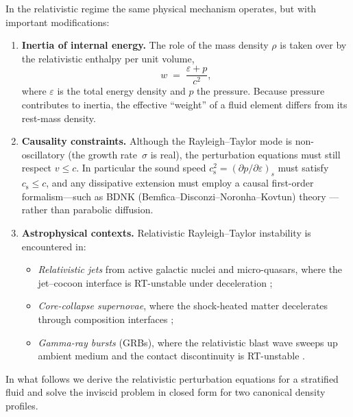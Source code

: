 In the relativistic regime the same physical mechanism operates, but with
important modifications:
\begin{enumerate}
\item \textbf{Inertia of internal energy.}  The role of the mass density
  $\rho$ is taken over by the relativistic enthalpy per unit volume,
  \begin{equation}
  \label{eq:rel-10-w-def}
  w \;=\; \frac{\varepsilon + p}{c^{2}},
  \end{equation}
  where $\varepsilon$ is the total energy density and $p$ the pressure.
  Because pressure contributes to inertia, the effective ``weight'' of a
  fluid element differs from its rest-mass density.

\item \textbf{Causality constraints.}  Although the Rayleigh--Taylor mode
  is non-oscillatory (the growth rate~$\sigma$ is real), the perturbation
  equations must still respect $v \le c$.  In particular the sound speed
  $c_{\mathrm{s}}^{2} = (\partial p/\partial\varepsilon)_{s}$ must
  satisfy $c_{\mathrm{s}} \le c$, and any dissipative extension must
  employ a causal first-order formalism---such as BDNK
  (Bemfica--Disconzi--Noronha--Kovtun) theory
  \citep{BemficaDN2018,Kovtun2019}---rather than parabolic diffusion.

\item \textbf{Astrophysical contexts.}  Relativistic Rayleigh--Taylor
  instability is encountered in:
  \begin{itemize}
  \item \emph{Relativistic jets} from active galactic nuclei and
    micro-quasars, where the jet--cocoon interface is RT-unstable under
    deceleration \citep[e.g.][]{Matsumoto2013};
  \item \emph{Core-collapse supernovae}, where the shock-heated matter
    decelerates through composition interfaces \citep{Couch2014};
  \item \emph{Gamma-ray bursts} (GRBs), where the relativistic blast
    wave sweeps up ambient medium and the contact discontinuity is
    RT-unstable \citep{Duffell2013}.
  \end{itemize}
\end{enumerate}

In what follows we derive the relativistic perturbation equations for a
stratified fluid and solve the inviscid problem in closed form for two
canonical density profiles.

